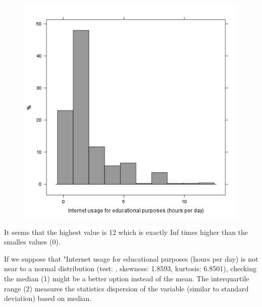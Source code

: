 \documentclass{article}
\makeatletter
\def\maxwidth{\ifdim\Gin@nat@width>\linewidth\linewidth
\else\Gin@nat@width\fi}
\let\Oldincludegraphics\includegraphics
\renewcommand{\includegraphics}[1]{\Oldincludegraphics[width=\maxwidth]{#1}}
\makeatother
\begin{document}
\begin{figure}[htbp]
\centering
\includegraphics{23Oh2OoI5HNo2JhZ5oooO4mOOOOOOOOoloe2O7hZ5oomOOOOLONQONO4mOOOOOOOOoloA5olQ87hZ5oomOOOOL.png}
\caption{}
\end{figure}

It seems that the highest value is 12 which is exactly Inf times higher
than the smalles values (0).

If we suppose that "Internet usage for educational purposes (hours per
day) is not near to a normal distribution (test: , skewness: 1.8593,
kurtosis: 6.8501), checking the median (1) might be a better option
instead of the mean. The interquartile range (2) measures the statistics
dispersion of the variable (similar to standard deviation) based on
median.
\end{document}
